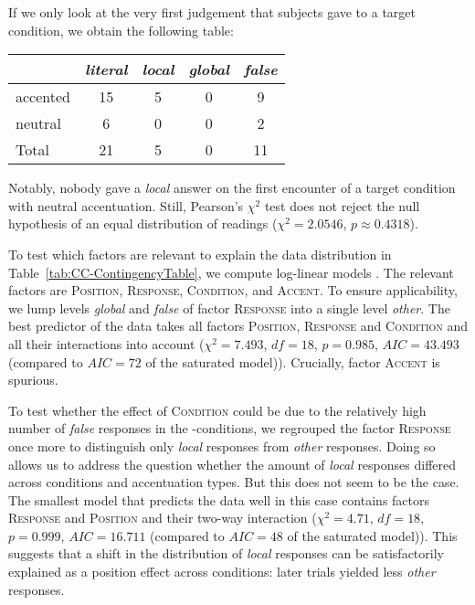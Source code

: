 \documentclass[fleqn,reqno,10pt]{article}
\renewcommand{\es}{\acro{es}}
\begin{document}
If we only look at the very first judgement that subjects gave to a
target condition, we obtain the following table:
\begin{center}
\begin{tabular}{lcccc}
    & \emph{literal} & \emph{local} & \emph{global} & \emph{false} \\
    \midrule
    accented & 15 &  5 & 0 &  9 \\
    neutral  &  6 &  0 & 0 &  2 \\ \addlinespace[0.15cm]
    Total    & 21 &  5 & 0 & 11
\end{tabular}
\end{center}
Notably, nobody gave a \emph{local} answer on the first encounter of a
target condition with neutral accentuation. Still, Pearson's $\chi^2$
test does not reject the null hypothesis of an equal distribution of
readings ($\chi^2 = 2.0546$, $p \approx 0.4318$).  

To test which factors are relevant to explain the data distribution in
Table~\ref{tab:CC-ContingencyTable}, we compute log-linear models
\citep{KnokeBurke1980:Log-Linear-Mode}. The relevant factors are
\textsc{Position}, \textsc{Response}, \textsc{Condition}, and
\textsc{Accent}. To ensure applicability, we lump levels \emph{global}
and \emph{false} of factor \textsc{Response} into a single level
\emph{other}. The best predictor of the data takes all factors
\textsc{Position}, \textsc{Response} and \textsc{Condition} and all
their interactions into account ($\chi^2 = 7.493$, $df=18$, $p =
0.985$, $AIC = 43.493$ (compared to $AIC=72$ of the saturated
model)). Crucially, factor \textsc{Accent} is spurious.

To test whether the effect of \textsc{Condition} could be due to the
relatively high number of \emph{false} responses in the
\es-conditions, we regrouped the factor \textsc{Response} once more to
distinguish only \emph{local} responses from \emph{other}
responses. Doing so allows us to address the question whether the
amount of \emph{local} responses differed across conditions and
accentuation types. But this does not seem to be the case. The
smallest model that predicts the data well in this case contains
factors \textsc{Response} and \textsc{Position} and their two-way
interaction ($\chi^2 = 4.71$, $df=18$, $p = 0.999$, $AIC = 16.711$
(compared to $AIC=48$ of the saturated model)). This suggests that a
shift in the distribution of \emph{local} responses can be
satisfactorily explained as a position effect across conditions: later
trials yielded less \emph{other} responses.
\end{document}
